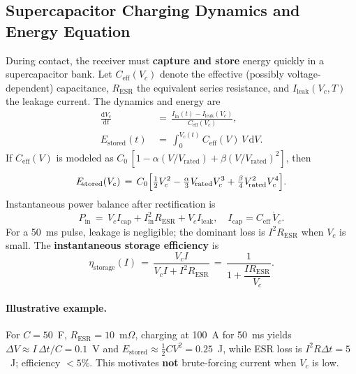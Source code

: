 \documentclass[11pt]{article}
\begin{document}
\subsection{Supercapacitor Charging Dynamics and Energy Equation}
During contact, the receiver must \textbf{capture and store} energy quickly in a supercapacitor bank. Let $C_{\!\mathrm{eff}}(V_c)$ denote the effective (possibly voltage-dependent) capacitance, $R_{\!\mathrm{ESR}}$ the equivalent series resistance, and $I_{\!\mathrm{leak}}(V_c,T)$ the leakage current. The dynamics and energy are
\begin{align}
  \frac{\mathrm{d}V_c}{\mathrm{d}t} \,&=\, \frac{I_{\!\mathrm{in}}(t) - I_{\!\mathrm{leak}}(V_c)}{C_{\!\mathrm{eff}}(V_c)},\\
  E_{\!\mathrm{stored}}(t) \,&=\, \int_0^{V_c(t)} C_{\!\mathrm{eff}}(V)\,V\,\mathrm{d}V.
\end{align}
If $C_{\!\mathrm{eff}}(V)$ is modeled as $C_0\,[1-\alpha (V/V_{\!\mathrm{rated}})+\beta (V/V_{\!\mathrm{rated}})^2]$, then
\begin{equation}
  E_{\!\mathrm{stored}}(V_c) \,=\, C_0\Bigl[\tfrac{1}{2}V_c^2 - \tfrac{\alpha}{3} V_{\!\mathrm{rated}} V_c^3 + \tfrac{\beta}{4} V_{\!\mathrm{rated}}^2 V_c^4\Bigr].
\end{equation}
Instantaneous power balance after rectification is
\begin{equation}
  P_{\!\mathrm{in}} \,=\, V_c I_{\!\mathrm{cap}} + I_{\!\mathrm{in}}^2 R_{\!\mathrm{ESR}} + V_c I_{\!\mathrm{leak}},\quad I_{\!\mathrm{cap}} = C_{\!\mathrm{eff}}\,\dot V_c.
\end{equation}
For a 50~ms pulse, leakage is negligible; the dominant loss is $I^2 R_{\!\mathrm{ESR}}$ when $V_c$ is small. The \textbf{instantaneous storage efficiency} is
\begin{equation}
  \eta_{\!\mathrm{storage}}(I) \,=\, \frac{V_c I}{V_c I + I^2 R_{\!\mathrm{ESR}}} \,=\, \frac{1}{1 + \dfrac{I R_{\!\mathrm{ESR}}}{V_c}}.
\end{equation}

\paragraph{Illustrative example.} For $C=50$~F, $R_{\!\mathrm{ESR}}=10$~m$\Omega$, charging at 100~A for 50~ms yields $\Delta V \approx I\,\Delta t/C = 0.1$~V and $E_{\!\mathrm{stored}}\approx \tfrac{1}{2} C V^2 = 0.25$~J, while ESR loss is $I^2 R \Delta t = 5$~J; efficiency $<5\%$. This motivates \textbf{not} brute-forcing current when $V_c$ is low.
\end{document}
